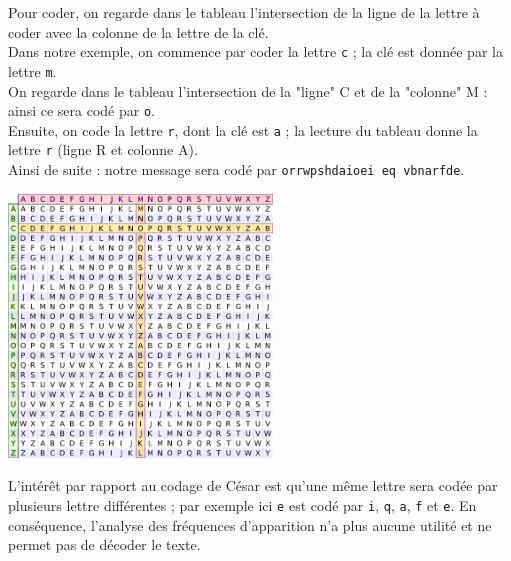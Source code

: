 \documentclass[t,11pt]{article}
\begin{document}
\begin{minipage}{0.5\linewidth}
Pour coder, on regarde dans le tableau l'intersection de la ligne de la lettre à coder avec la colonne de la lettre de la clé.\\

Dans notre exemple, on commence par coder la lettre \texttt{c} ; la clé est donnée par la lettre  \texttt{m}.\\ On regarde dans le tableau l'intersection de  la "ligne" C et de la "colonne" M  : ainsi ce sera codé par  \texttt{o}.\\

Ensuite, on code la lettre  \texttt{r}, dont la clé est  \texttt{a} ; la lecture du tableau donne la lettre  \texttt{r} (ligne R et colonne A). \\

Ainsi de suite : notre message sera codé par \texttt{orrwpshdaioei eq vbnarfde}. 
\end{minipage}
\begin{minipage}{0.5\linewidth}
\begin{center}\includegraphics[width=7cm]{vigenere2.png}\end{center}
\end{minipage}
\newpage
L'intérêt par rapport au codage de César est qu'une même lettre sera codée par plusieurs lettre différentes ; par exemple ici \texttt{e} est codé par \texttt{i}, \texttt{q}, \texttt{a}, \texttt{f} et \texttt{e}. En conséquence, l'analyse des fréquences d'apparition n'a plus aucune utilité et ne permet pas de décoder le texte. \\
\end{document}

